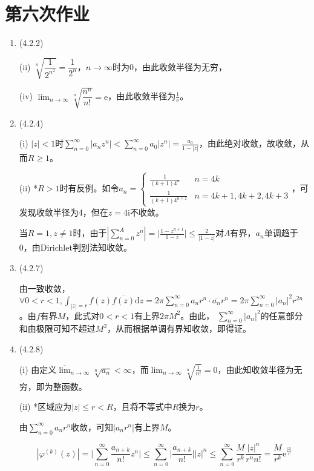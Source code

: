 \documentclass[a4paper,UTF8,fontset=windows]{ctexart}
\begin{document}
\section{第六次作业}
\begin{enumerate}
    \item (4.2.2)
    
    (ii) $\sqrt[n]{\dfrac{1}{2^{n^2}}}=\dfrac{1}{2^n}$，$n\to\infty$时为0，由此收敛半径为无穷，
    
    (iv) $\lim_{n\to\infty}\sqrt[n]{\dfrac{n^n}{n!}}=\mathrm{e}$，由此收敛半径为$\frac{1}{\mathrm{e}}$。
    
    \item (4.2.4)
    
    (i) $|z|<1$时$\sum_{n=0}^\infty|a_nz^n|<\sum_{n=0}^\infty a_0|z^n|=\frac{a_0}{1-|z|}$，由此绝对收敛，故收敛，从而$R\ge1$。
    
    (ii) *$R>1$时有反例。如令$a_n=\begin{cases}\frac{1}{(k+1)4^n}&n=4k\\\frac{1}{(k+1)4^{n+1}}&n=4k+1,4k+2,4k+3\end{cases}$，可发现收敛半径为4，但在$z=4\mathrm{i}$不收敛。
    
    当$R=1,z\ne1$时，由于$|\sum_{n=0}^Az^n|=\big|\frac{1-z^{n+1}}{1-z}\big|\le\frac{2}{|1-z|}$对$A$有界，$a_n$单调趋于0，由Dirichlet判别法知收敛。
    
    \item (4.2.7)
    
    由一致收敛，$\forall0<r<1,\int_{|z|=r}f(z)\overline{f(z)}\mathrm{d}z=2\pi\sum_{n=0}^\infty a_nr^n\cdot\overline{a_n}r^n=2\pi\sum_{n=0}^\infty|a_n|^2r^{2n}$。由$f$有界$M$，此式对$0<r<1$有上界$2\pi M^2$。由此， $\sum_{n=0}^\infty|a_n|^2$的任意部分和由极限可知不超过$M^2$，从而根据单调有界知收敛，即得证。
    
    \item (4.2.8)
    
    (i) 由定义$\overline{\lim}_{n\to\infty}\sqrt[n]{a_n}<\infty$，而$\lim_{n\to\infty}\sqrt[n]{\frac{1}{n!}}=0$，由此知收敛半径为无穷，即为整函数。
    
    (ii) *区域应为$|z|\le r<R$，且将不等式中$R$换为$r$。
    
    由$\sum_{n=0}^\infty a_nr^n$收敛，可知$|a_nr^n|$有上界$M$。
    
    \[|\varphi^{(k)}(z)|=\bigg|\sum_{n=0}^\infty\frac{a_{n+k}}{n!}z^n\bigg|\le\sum_{n=0}^\infty\bigg|\frac{a_{n+k}}{n!}\bigg||z|^n\le\sum_{n=0}^\infty\frac{M}{r^k}\frac{|z|^n}{r^nn!}=\frac{M}{r^k}\mathrm{e}^{\frac{|z|}{r}}\]
    

\end{enumerate}
\end{document}
